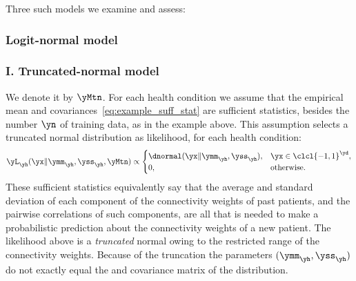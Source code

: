 Three such models we examine and assess:

\subsubsection{Logit-normal model}






\subsubsection{I. Truncated-normal model} We denote it by $\yMtn$. For each
health condition we assume that the empirical mean and
covariances~\eqref{eq:example_suff_stat} are sufficient statistics, besides
the number $\yn$ of training data, as in the example above. This assumption
selects a truncated normal distribution as likelihood, for each health
condition:
\begin{equation}
  \label{eq:truncated-normal}
  \yL_{\yh}(\yx \| \ymm_{\yh}, \yss_{\yh}, \yMtn)
  \propto
  \begin{cases}
    \dnormal(\yx \| \ymm_{\yh}, \yss_{\yh}), & \yx \in \clcl{-1,1}^{\yd},
    \\
    0, & \text{otherwise}.
  \end{cases}
\end{equation}
These sufficient statistics equivalently say that the average and standard
deviation of each component of the connectivity weights of past patients, and
the pairwise correlations of such components, are all that is needed to
make a probabilistic prediction about the connectivity weights of a new
patient. The likelihood above is a \emph{truncated} normal owing to the
restricted range of the connectivity weights. Because of the truncation the
parameters $(\ymm_{\yh}, \yss_{\yh})$ do not exactly equal the and
covariance matrix of the distribution.

